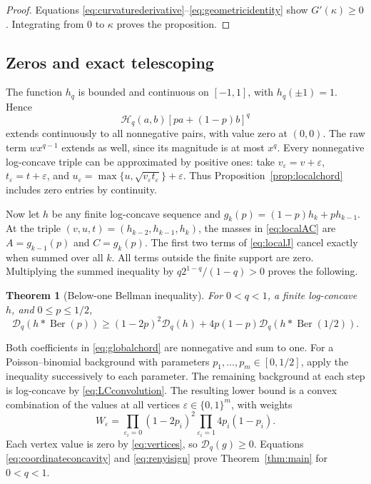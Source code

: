 \documentclass[11pt,a4paper]{amsart}
\numberwithin{equation}{section}
\newtheorem{theorem}{Theorem}[section]
\theoremstyle{remark}
\newcommand{\Ber}{\operatorname{Ber}}
\newcommand{\D}{\mathscr D}
\newcommand{\HH}{\mathscr H}
\newcommand{\eps}{\varepsilon}
\begin{document}
\begin{proof}
Equations \eqref{eq:curvaturederivative}--\eqref{eq:geometricidentity}
show $G'(\kappa)\ge0$. Integrating from $0$ to $\kappa$ proves the
proposition.
\end{proof}

\subsection{Zeros and exact telescoping}

The function $h_q$ is bounded and continuous on $[-1,1]$, with
$h_q(\pm1)=1$. Hence
\[
\HH_q(a,b)[pa+(1-p)b]^q
\]
extends continuously to all nonnegative pairs, with value zero at
$(0,0)$. The raw term $w x^{q-1}$ extends as well, since its magnitude
is at most $x^q$. Every nonnegative log-concave triple can be
approximated by positive ones: take $v_\eps=v+\eps$, $t_\eps=t+\eps$,
and $u_\eps=\max\{u,\sqrt{v_\eps t_\eps}\}+\eps$.
Thus Proposition~\ref{prop:localchord} includes zero entries by
continuity.

Now let $h$ be any finite log-concave sequence and
$g_k(p)=(1-p)h_k+ph_{k-1}$. At the triple
$(v,u,t)=(h_{k-2},h_{k-1},h_k)$, the masses in \eqref{eq:localAC} are
$A=g_{k-1}(p)$ and $C=g_k(p)$. The first two terms of
\eqref{eq:localJ} cancel exactly when summed over all $k$.
All terms outside the finite support are zero. Multiplying the summed
inequality by $q2^{1-q}/(1-q)>0$ proves the following.

\begin{theorem}[Below-one Bellman inequality]
\label{thm:lowerbellman}
For $0<q<1$, a finite log-concave $h$, and $0\le p\le1/2$,
\begin{equation}
\D_q(h*\Ber(p))\ge
 (1-2p)^2\D_q(h)+4p(1-p)\D_q(h*\Ber(1/2)).
\label{eq:globalchord}
\end{equation}
\end{theorem}

Both coefficients in \eqref{eq:globalchord} are nonnegative and sum
to one. For a Poisson--binomial background with parameters
$p_1,\ldots,p_m\in[0,1/2]$, apply the inequality successively to each
parameter. The remaining background at each step is log-concave by
\eqref{eq:LCconvolution}. The resulting lower bound is a convex combination of the
values at all vertices $\eps\in\{0,1\}^m$, with weights
\[
W_\eps=\prod_{\eps_i=0}(1-2p_i)^2
        \prod_{\eps_i=1}4p_i(1-p_i).
\]
Each vertex value is zero by \eqref{eq:vertices}, so $\D_q(g)\ge0$.
Equations \eqref{eq:coordinateconcavity} and \eqref{eq:renyisign}
prove Theorem~\ref{thm:main} for $0<q<1$.
\end{document}
